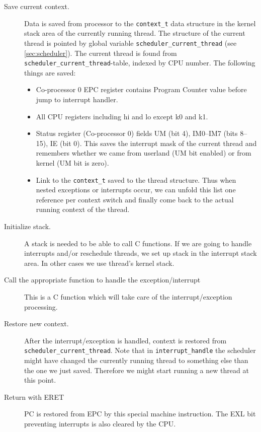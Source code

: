 \documentclass[twoside,a4paper]{report}
\begin{document}
\begin{description}
\item[Save current context.]  Data is saved from
  processor to the \texttt{context\_t}
   data structure in the kernel
  stack area of the currently running thread. The structure of the
  current thread is pointed by global variable
  \texttt{scheduler\_current\_thread}
  (see \autoref{sec:scheduler}). The current thread is found from
  \texttt{scheduler\_current\_thread}-table, indexed by CPU number.
  The following things are saved:
  \begin{itemize}
  \item Co-processor 0 EPC register contains Program Counter value
    before jump to interrupt handler.
  \item All CPU registers including hi and lo except k0 and k1.
  \item Status register (Co-processor 0) fields UM (bit 4), IM0--IM7
  (bits 8--15), IE (bit 0). This saves the interrupt mask of the
  current thread and remembers whether we came from userland (UM bit
  enabled) or from kernel (UM bit is zero).
  \item Link to the \texttt{context\_t} saved to the thread structure.
  Thus when nested exceptions or interrupts occur, we can unfold this
  list one reference per context switch and finally come back to the
  actual running context of the thread.
  \end{itemize}

\item[Initialize stack.] A stack is needed to be able to call C
  functions. If we are going to handle interrupts and/or reschedule
  threads, we set up stack in the interrupt stack area. In other cases
  we use thread's kernel stack.

\item[Call the appropriate function to handle the exception/interrupt]
  This is a C function which will take care of the interrupt/exception
  processing.

\item[Restore new context.]  After the
interrupt/exception is handled, context is restored from
\texttt{scheduler\_current\_thread}. Note that in
\texttt{interrupt\_handle}
 the scheduler
might have changed the currently running thread to something else than
the one we just saved. Therefore we might start running a new thread at
this point.

\item[Return with ERET] PC is restored from EPC by this special machine
instruction. The EXL bit preventing interrupts is also cleared by the
CPU.

\end{description}
\end{document}
